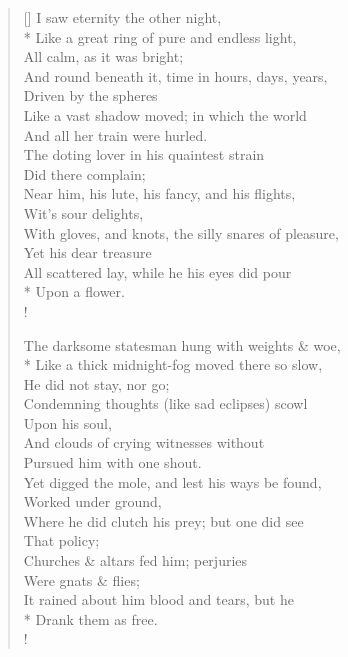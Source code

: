 \documentclass[MAIN]{subfiles}
\begin{document}
\settowidth{\versewidth}{Like a great ring of pure and endless light,}
\begin{verse}[\versewidth]
I saw eternity the other night,\\*
Like a great ring of pure and endless light,\\
\vin All calm, as it was bright;\\
And round beneath it, time in hours, days, years,\\
\vin Driven by the spheres\\
Like a vast shadow moved; in which the world\\
\vin And all her train were hurled.\\
The doting lover in his quaintest strain\\
\vin Did there complain;\\
Near him, his lute, his fancy, and his flights,\\
\vin Wit's sour delights,\\
With gloves, and knots, the silly snares of pleasure,\\
\vin Yet his dear treasure\\
All scattered lay, while he his eyes did pour\\*
\vin Upon a flower.\\!

The darksome statesman hung with weights \& woe,\\*
Like a thick midnight-fog moved there so slow,\\
\vin He did not stay, nor go;\\
Condemning thoughts (like sad eclipses) scowl\\
\vin Upon his soul,\\
And clouds of crying witnesses without\\
\vin Pursued him with one shout.\\
Yet digged the mole, and lest his ways be found,\\
\vin Worked under ground,\\
Where he did clutch his prey; but one did see\\
\vin That policy;\\
Churches \& altars fed him; perjuries\\
\vin Were gnats \& flies;\\
It rained about him blood and tears, but he\\*
\vin Drank them as free.\\!


\end{verse}
\end{document}
